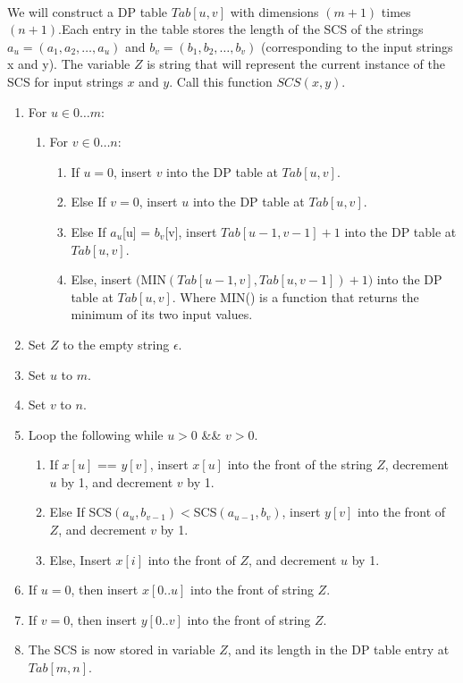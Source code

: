 \documentclass{article}
\begin{document}
\paragraph{\indent}
We will construct a DP table $Tab[u,v]$ with dimensions $(m + 1)$ times $(n + 1)$.Each
entry in the table stores the length of the SCS of the strings $a_u =
      (a_1,a_2,\ldots,a_u)$ and $b_v = (b_1,b_2,\ldots,b_v)$ (corresponding to the input strings
x and y). The variable $Z$ is string that will
represent the current instance of the SCS for input strings $x$ and $y$.
Call this function $SCS(x,y)$.
\begin{enumerate}
      \item For $u \in 0\ldots m$:
            \begin{enumerate}
                  \item For $v \in 0\ldots n$:
                        \begin{enumerate}
                              \item If $u=0$, insert $v$ into the DP table at $Tab[u,v]$.
                              \item Else If $v=0$, insert $u$ into the DP table at $Tab[u,v]$.
                              \item Else If $a_u$[u] = $b_v$[v], insert $Tab[u-1, v-1] + 1$
                                    into the DP table at $Tab[u,v]$.
                              \item Else, insert $($MIN$(Tab[u-1,v], Tab[u, v-1]) + 1)$ into the
                                    DP table at $Tab[u,v]$. Where MIN() is a function that
                                    returns the minimum of its two input values.
                        \end{enumerate}
            \end{enumerate}
      \item Set $Z$ to the empty string $\epsilon$.
      \item Set $u$ to $m$.
      \item Set $v$ to $n$.
      \item Loop the following while $u>0$ \&\& $v>0$.
            \begin{enumerate}
                  \item If $x[u]$ == $y[v]$, insert $x[u]$ into the front of the string
                        $Z$, decrement $u$ by 1, and decrement $v$ by 1.
                  \item Else If SCS$(a_u, b_{v-1}) < $SCS$(a_{u-1}, b_v)$, insert $y[v]$
                        into the front of $Z$, and decrement $v$ by 1.
                  \item Else, Insert $x[i]$ into the front of $Z$, and decrement $u$ by 1.
            \end{enumerate}
      \item If $u = 0$, then insert $x[0..u]$ into the front of string $Z$.
      \item If $v = 0$, then insert $y[0..v]$ into the front of string $Z$.
      \item The SCS is now stored in variable $Z$, and its length in the DP table entry at
            $Tab[m,n]$.
\end{enumerate}
\end{document}
